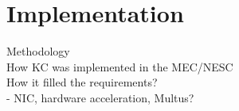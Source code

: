 \chapter{Implementation}
\label{chapter:implementation}

Methodology \\
How KC was implemented in the MEC/NESC \\
How it filled the requirements? \\
- NIC, hardware acceleration, Multus? \\
